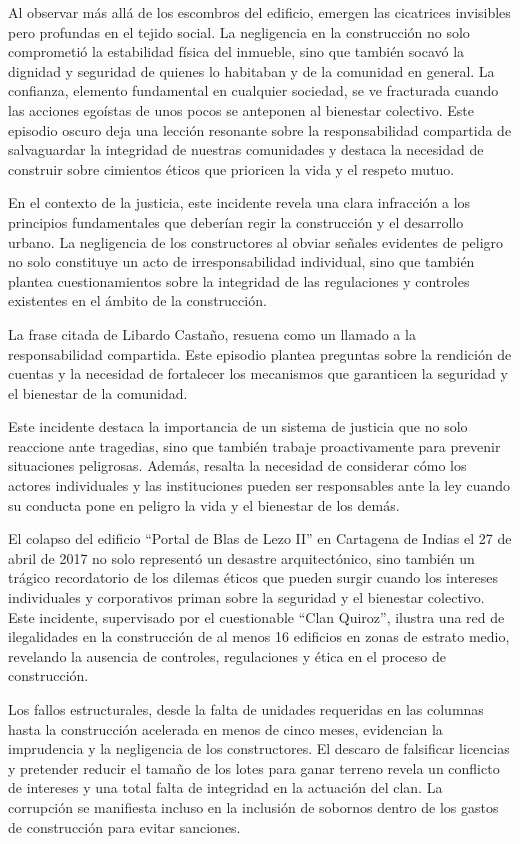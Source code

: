 \documentclass[letterpaper, 12pt]{article}
\begin{document}
Al observar más allá de los escombros del edificio, emergen
las cicatrices invisibles pero profundas en el tejido
social. La negligencia en la construcción no solo
comprometió la estabilidad física del inmueble, sino que
también socavó la dignidad y seguridad de quienes lo
habitaban y de la comunidad en general. La confianza,
elemento fundamental en cualquier sociedad, se ve
fracturada cuando las acciones egoístas de unos pocos se
anteponen al bienestar colectivo. Este episodio oscuro deja
una lección resonante sobre la responsabilidad compartida
de salvaguardar la integridad de nuestras comunidades y
destaca la necesidad de construir sobre cimientos éticos
que prioricen la vida y el respeto mutuo.

En el contexto de la justicia, este incidente revela una
clara infracción a los principios fundamentales que
deberían regir la construcción y el desarrollo urbano. La
negligencia de los constructores al obviar señales
evidentes de peligro no solo constituye un acto de
irresponsabilidad individual, sino que también plantea
cuestionamientos sobre la integridad de las regulaciones y
controles existentes en el ámbito de la construcción.

La frase citada de Libardo Castaño, resuena como un llamado
a la responsabilidad compartida. Este episodio plantea
preguntas sobre la rendición de cuentas y la necesidad de
fortalecer los mecanismos que garanticen la seguridad y el
bienestar de la comunidad.

Este incidente destaca la importancia de un sistema de
justicia que no solo reaccione ante tragedias, sino que
también trabaje proactivamente para prevenir situaciones
peligrosas. Además, resalta la necesidad de considerar cómo
los actores individuales y las instituciones pueden ser
responsables ante la ley cuando su conducta pone en peligro
la vida y el bienestar de los demás.

El colapso del edificio ``Portal de Blas de Lezo II'' en
Cartagena de Indias el 27 de abril de 2017 no solo
representó un desastre arquitectónico, sino también un
trágico recordatorio de los dilemas éticos que pueden
surgir cuando los intereses individuales y corporativos
priman sobre la seguridad y el bienestar colectivo. Este
incidente, supervisado por el cuestionable ``Clan Quiroz'',
ilustra una red de ilegalidades en la construcción de al
menos 16 edificios en zonas de estrato medio, revelando la
ausencia de controles, regulaciones y ética en el proceso
de construcción.

Los fallos estructurales, desde la falta de unidades
requeridas en las columnas hasta la construcción acelerada
en menos de cinco meses, evidencian la imprudencia y la
negligencia de los constructores. El descaro de falsificar
licencias y pretender reducir el tamaño de los lotes para
ganar terreno revela un conflicto de intereses y una total
falta de integridad en la actuación del clan. La corrupción
se manifiesta incluso en la inclusión de sobornos dentro de
los gastos de construcción para evitar sanciones.
\end{document}
